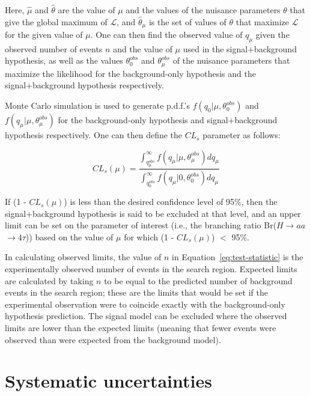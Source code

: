 Here, $\hat{\mu}$ and $\hat{\theta}$ are the value of $\mu$ and the values of the nuisance parameters $\theta$ that give the global maximum of $\mathcal{L}$, and $\hat{\theta}_{\mu}$ is the set of values of $\theta$ that maximize $\mathcal{L}$ for the given value of $\mu$. One can then find the observed value of $q_{\mu}$ given the observed number of events $n$ and the value of $\mu$ used in the signal+background hypothesis, as well as the values $\theta^{obs}_{0}$ and $\theta^{obs}_{\mu}$ of the nuisance parameters that maximize the likelihood for the background-only hypothesis and the signal+background hypothesis respectively.

Monte Carlo simulation is used to generate p.d.f.'s $f(q_{0}\vert\mu,\theta^{obs}_{0})$ and $f(q_{\mu}\vert\mu,\theta^{obs}_{\mu})$ for the background-only hypothesis and signal+background hypothesis respectively. One can then define the $CL_{s}$ parameter as follows:

\begin{equation}
CL_{s}(\mu) = \frac{\int_{q^{obs}_{\mu}}^{\infty} f(q_{\mu}\vert\mu,\theta^{obs}_{\mu}) dq_{\mu}}{\int_{q^{obs}_{0}}^{\infty} f(q_{\mu}\vert0,\theta^{obs}_{0}) dq_{\mu}}
\label{eq:CLS-def}
\end{equation}

If (1 - $CL_{s}(\mu)$) is less than the desired confidence level of 95\%, then the signal+background hypothesis is said to be excluded at that level, and an upper limit can be set on the parameter of interest (i.e., the branching ratio Br($H\rightarrow$$aa$$\rightarrow4\tau$)) based on the value of $\mu$ for which (1 - $CL_{s}(\mu)$) $<$ 95\%.

In calculating observed limits, the value of $n$ in Equation~\ref{eq:test-statistic} is the experimentally observed number of events in the search region. Expected limits are calculated by taking $n$ to be equal to the predicted number of background events in the search region; these are the limits that would be set if the experimental observation were to coincide exactly with the background-only hypothesis prediction. The signal model can be excluded where the observed limits are lower than the expected limits (meaning that fewer events were observed than were expected from the background model).

\section{Systematic uncertainties\label{sec:results-systematics}}

